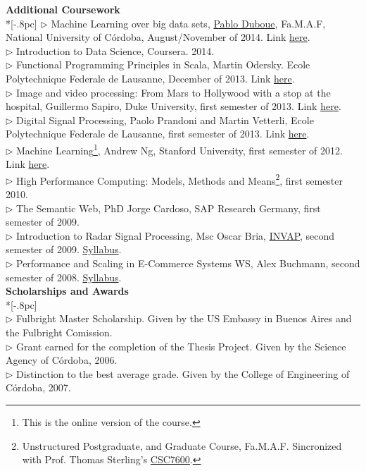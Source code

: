 \documentclass[letter,11pt,english]{article}
\begin{document}
{\large \bf Additional Coursework}\\ *[-.8pc]
\underline{\hspace{6in}}
$\triangleright$ Machine Learning over big data sets,  \href{http://duboue.net/}{Pablo Duboue}, Fa.M.A.F, National University of C\'ordoba, August/November of 2014. Link \href{http://aprendizajengrande.net/}{here}. \\
$\triangleright$ Introduction to Data Science, Coursera. 2014.\\
$\triangleright$ Functional Programming Principles in Scala,  Martin Odersky. Ecole Polytechnique Federale de Lausanne, December of 2013. Link \href{https://www.coursera.org/course/progfun}{here}. \\
$\triangleright$ Image and video processing: From Mars to Hollywood with a stop at the hospital, Guillermo Sapiro, Duke University, first semester of 2013. Link \href{https://www.coursera.org/course/images}{here}. \\
$\triangleright$ Digital Signal Processing, Paolo Prandoni and Martin Vetterli, Ecole Polytechnique Federale de Lausanne, first semester of 2013. Link \href{https://www.coursera.org/course/dsp}{here}. \\
$\triangleright$ Machine Learning\footnote{This is the online version of the course.}, Andrew Ng, Stanford University, first semester of 2012. Link \href{http://www.ml-class.org}{here}. \\
$\triangleright$ High Performance Computing: Models, Methods and Means\footnote{Unstructured Postgraduate,
and Graduate Course, Fa.M.A.F. Sincronized with Prof. Thomas Sterling's 
\href{https://www.cct.lsu.edu/csc7600/Home.html}{CSC7600}.}, first semester 2010.\\
$\triangleright$ The Semantic Web, PhD Jorge Cardoso, SAP Research Germany, first semester of 2009.\\
$\triangleright$ Introduction to Radar Signal Processing, Msc Oscar Bria, 
\href{http://www.invap.net/index-e.php}{INVAP}, second semester of 2009. \href{http://postgrado.info.unlp.edu.ar/Cursos/Cursos/11-2011_Introduccion_al_Procesamiento_de_Senales_Radar.pdf}{Syllabus}.\\
$\triangleright$ Performance and Scaling in E-Commerce Systems WS, Alex Buchmann, second semester of 2008. 
\href{http://www.dvs.tu-darmstadt.de/teaching/perf/2008/}{Syllabus}.\\



{\bf Scholarships and Awards} \\*[-.8pc]
\underline{\hspace{6in}} \\
\renewcommand{\labelitemi}{}
$\triangleright$ Fulbright Master Scholarship.
Given by the US Embassy in Buenos Aires and the Fulbright Comission.\\
$\triangleright$ Grant earned for the completion of the Thesis Project.
Given by the Science Agency of C\'ordoba, 2006.\\
$\triangleright$ Distinction to the best average grade.
Given by the College of Engineering of C\'ordoba, 2007.\\
\end{document}
